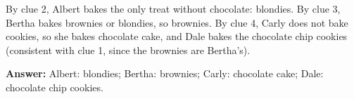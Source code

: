 By clue 2, Albert bakes the only treat without chocolate: blondies. By clue 3, Bertha bakes brownies or blondies, so brownies. By clue 4, Carly does not bake cookies, so she bakes chocolate cake, and Dale bakes the chocolate chip cookies (consistent with clue 1, since the brownies are Bertha's).

\textbf{Answer:} Albert: blondies; Bertha: brownies; Carly: chocolate cake; Dale: chocolate chip cookies.
